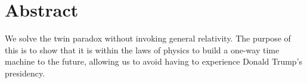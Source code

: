 \chapter*{Abstract}
	We solve the twin paradox without invoking general relativity. The purpose of this is to show that it is within the laws of physics to build a one-way time machine to the future, allowing us to avoid having to experience Donald Trump's presidency.
